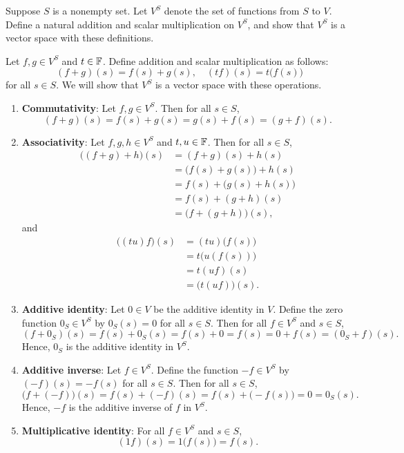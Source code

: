 \begin{exc}
\begin{exercise}
Suppose $S$ is a nonempty set. Let $V^S$ denote the set of functions from $S$
to $V$. Define a natural addition and scalar multiplication on $V^S$, and show
that $V^S$ is a vector space with these definitions.
\end{exercise}
\begin{solution}
Let $f,g\in V^S$ and $t\in\mathbb{F}$. Define addition and scalar multiplication as
follows:
\[ (f+g)(s) = f(s)+g(s), \quad (tf)(s) = t\bigl(f(s)\bigr) \]
for all $s\in S$. We will show that $V^S$ is a vector space with these
operations.
\begin{enumerate}[label=\arabic*)]
\item \textbf{Commutativity}: Let $f,g\in V^S$. Then for all $s\in S$,
  \[ (f+g)(s) = f(s)+g(s) = g(s)+f(s) = (g+f)(s). \]
\item \textbf{Associativity}: Let $f,g,h\in V^S$ and $t,u\in\mathbb{F}$. Then for all
  $s\in S$,
  \begin{align*}
  \bigl((f+g)+h\bigr)(s) &= (f+g)(s)+h(s)\\
    &= \bigl(f(s)+g(s)\bigr)+h(s)\\
    &= f(s)+\bigl(g(s)+h(s)\bigr)\\
    &= f(s)+(g+h)(s)\\
    &= \bigl(f+(g+h)\bigr)(s),
  \end{align*}
  and
  \begin{align*}
  \bigl((tu)f\bigr)(s) &= (tu)\bigl(f(s)\bigr)\\
    &= t\bigl(u(f(s))\bigr)\\
    &= t(uf)(s)\\
    &= \bigl(t(uf)\bigr)(s).
  \end{align*}
\item \textbf{Additive identity}: Let $0\in V$ be the additive identity in $V$.
  Define the zero function $0_S\in V^S$ by $0_S(s)=0$ for all $s\in S$. Then
  for all $f\in V^S$ and $s\in S$,
  \[ (f+0_S)(s) = f(s)+0_S(s) = f(s)+0 = f(s) = 0+f(s) = (0_S+f)(s). \]
  Hence, $0_S$ is the additive identity in $V^S$.
\item \textbf{Additive inverse}: Let $f\in V^S$. Define the function
  $-f\in V^S$ by $(-f)(s)=-f(s)$ for all $s\in S$. Then for all $s\in S$,
  \[ \bigl(f+(-f)\bigr)(s) = f(s)+(-f)(s) = f(s)+\bigl(-f(s)\bigr) = 0
     = 0_S(s). \]
  Hence, $-f$ is the additive inverse of $f$ in $V^S$.
\item \textbf{Multiplicative identity}: For all $f\in V^S$ and $s\in S$,
  \[ (1f)(s) = 1\bigl(f(s)\bigr) = f(s). \]

\end{enumerate}
\end{solution}
\end{exc}
